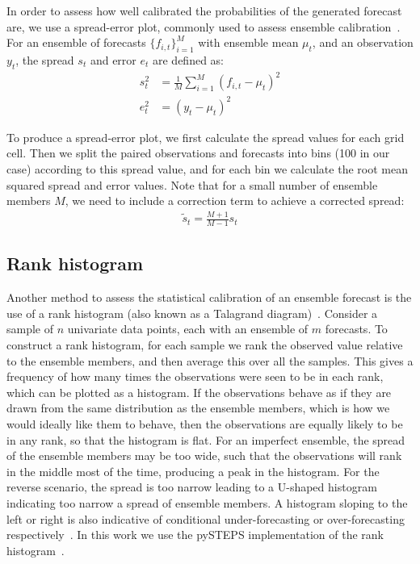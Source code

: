 \documentclass[../main.tex]{subfiles}
\begin{document}
In order to assess how well calibrated the probabilities of the generated forecast are, we use a spread-error plot, commonly used to assess ensemble calibration~\citep{leutbecher_ensemble_2008}. For an ensemble of forecasts $\{f_{i,t}\}_{i=1}^M$ with ensemble mean $\mu_t$, and an observation $y_t$, the spread $s_t$ and error $e_t$ are defined as:
\begin{align}
    s_t^2 &= \frac{1}{M} \sum_{i=1}^{M} \left( f_{i,t} - \mu_t \right)^2 \\
    e_t^2 &= ( y_t - \mu_t )^2
\end{align}

To produce a spread-error plot, we first calculate the spread values for each grid cell. Then we split the paired observations and forecasts into bins (100 in our case) according to this spread value, and for each bin we calculate the root mean squared spread and error values. Note that for a small number of ensemble members $M$, we need to include a correction term to achieve a corrected spread:
\begin{align}
    \tilde{s}_t = \frac{M+1}{M-1} s_t
\end{align}

\subsection{Rank histogram}
\label{rank_hist}
Another method to assess the statistical calibration of an ensemble forecast is the use of a rank histogram (also known as a Talagrand diagram)~\citep{wilks_forecast_2019}. Consider a sample of $n$ univariate data points, each with an ensemble of $m$ forecasts. To construct a rank histogram, for each sample we rank the observed value relative to the ensemble members, and then average this over all the samples. This gives a frequency of how many times the observations were seen to be in each rank, which can be plotted as a histogram. If the observations behave as if they are drawn from the same distribution as the ensemble members, which is how we would ideally like them to behave, then the observations are equally likely to be in any rank, so that the histogram is flat. For an imperfect ensemble, the spread of the ensemble members may be too wide, such that the observations will rank in the middle most of the time, producing a peak in the histogram. For the reverse scenario, the spread is too narrow leading to a U-shaped histogram indicating too narrow a spread of ensemble members. A histogram sloping to the left or right is also indicative of conditional under-forecasting or over-forecasting respectively~\citep{hamill_interpretation_2001, wilks_forecast_2019}. In this work we use the pySTEPS implementation of the rank histogram~\citep{pulkkinen_pysteps_2019}.

\ifSubfilesClassLoaded{%
    
    

}{}
\end{document}
